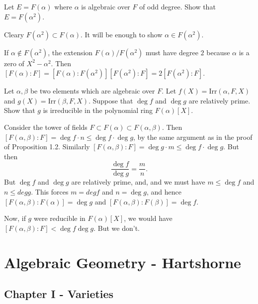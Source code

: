 \documentclass[11pt, english]{article}
\begin{document}
\begin{exc}
  Let $E=F(\alpha)$ where $\alpha$ is algebraic over $F$ of odd degree. Show that $E=F(\alpha^2)$.
\end{exc}
\begin{sol}
Cleary $F(\alpha^2) \subset F(\alpha)$. It will be enough to show $\alpha \in F(\alpha^2)$. 

If $\alpha \not \in F(\alpha^2)$, the extension $F(\alpha)/F(\alpha^2)$ must have degree $2$ because $\alpha$ is a zero of $X^2-\alpha^2$. Then $[F(\alpha):F]=[F(\alpha):F(\alpha^2)][F(\alpha^2):F]=2 [F(\alpha^2):F]$.
\end{sol}

\begin{exc}
 Let $\alpha, \beta$ be two elements which are algebraic over $F$. Let $f(X)=\mathrm{Irr}(\alpha,F,X)$ and $g(X)=\mathrm{Irr}(\beta,F,X)$. Suppose that $\deg f$ and $\deg g$ are relatively prime. Show that $g$ is irreducible in the polynomial ring $F(\alpha)[X]$.
\end{exc}

\begin{sol}
Consider the tower of fields $F \subset F(\alpha) \subset F(\alpha, \beta)$. Then $[F(\alpha,\beta):F] = \deg f \cdot n \leq \deg f \cdot \deg g$, by the same argument as in the proof of Proposition 1.2. Similarly $[F(\alpha,\beta):F]=\deg g \cdot m \leq \deg f \cdot \deg g$. But then
\[
\frac{\deg f}{\deg g} = \frac{m}{n}.
\]
But $\deg f$ and $\deg g$ are relatively prime, and, and we must have $m \leq \deg f$ and $n \leq deg g$. This forces $m = deg f$ and $n = \deg g$, and hence $[F(\alpha,\beta):F(\alpha)]=\deg g$ and $[F(\alpha,\beta):F(\beta)]=\deg f$.

Now, if $g$ were reducible in $F(\alpha)[X]$, we would have $[F(\alpha,\beta):F] < \deg f \deg g$. But we don't.
\end{sol}


\section{Algebraic Geometry - Hartshorne}

\subsection{Chapter I - Varieties}
\end{document}
